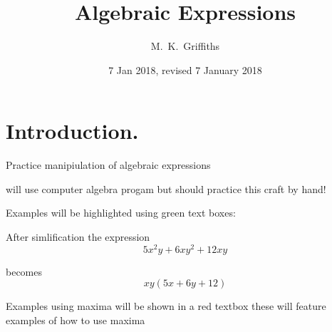 \documentclass[11pt]{article}
\begin{document}
\title{Algebraic Expressions}
\author{M.~K.~Griffiths}
\date{7 Jan 2018, revised 7 January 2018}
\maketitle
\insert{}
\section{Introduction.}\label{S1}

Practice manipiulation of algebraic expressions

will use computer algebra progam but should practice this craft by hand!

Examples will be highlighted using green text boxes:

\begin{tcolorbox}[colback=green!5!white,colframe=green!75!black]
 
After simlification the expression
\begin{equation}
5x^2y+6xy^2+12xy
\end{equation}

becomes
\begin{equation}
xy(5x+6y+12)
\end{equation}

\end{tcolorbox}


Examples using maxima will be shown in a red textbox these will feature examples of how to use maxima
\end{document}
